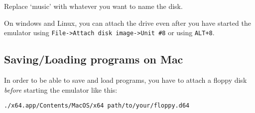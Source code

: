 \documentclass{article}
\begin{document}
Replace `music' with whatever you want to name the disk.

On windows and Linux, you can attach the drive even after you have started the emulator using \verb:File->Attach disk image->Unit #8: or using \verb:ALT+8:.

\subsection{Saving/Loading programs on Mac}

In order to be able to save and load programs, you have to attach a floppy disk \emph{before} starting the emulator like this:

\begin{lstlisting}
./x64.app/Contents/MacOS/x64 path/to/your/floppy.d64
\end{lstlisting}
\end{document}
